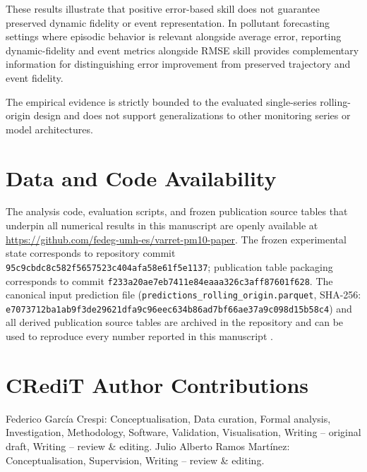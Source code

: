 \documentclass[12pt]{article}
\begin{document}
These results illustrate that positive error-based skill does not
guarantee preserved dynamic fidelity or event representation. In pollutant
forecasting settings where episodic behavior is relevant alongside average
error, reporting dynamic-fidelity and event metrics alongside RMSE skill
provides complementary information for distinguishing error improvement
from preserved trajectory and event fidelity.

The empirical evidence is strictly bounded to the evaluated single-series
rolling-origin design and does not support generalizations to other
monitoring series or model architectures.

\section*{Data and Code Availability}
\label{sec:data_availability}

The analysis code, evaluation scripts, and frozen publication source
tables that underpin all numerical results in this manuscript are
openly available at
\url{https://github.com/fedeg-umh-es/varret-pm10-paper}.
The frozen experimental state corresponds to repository commit
\texttt{95c9cbdc8c582f5657523c404afa58e61f5e1137}; publication
table packaging corresponds to commit
\texttt{f233a20ae7eb7411e84eaaa326c3aff87601f628}.
The canonical input prediction file
(\texttt{predictions\_rolling\_origin.parquet},
SHA-256: \texttt{e7073712ba1ab9f3de29621dfa9c96eec634b86ad7bf66ae37a9c098d15b58c4})
and all derived publication source tables are archived in the repository
and can be used to reproduce every number reported in this manuscript
\citep{sandve2013}.

\section*{CRediT Author Contributions}

Federico Garc\'ia Crespi: Conceptualisation, Data curation,
Formal analysis, Investigation, Methodology, Software, Validation,
Visualisation, Writing -- original draft, Writing -- review
\& editing.
Julio Alberto Ramos Mart\'inez: Conceptualisation, Supervision,
Writing -- review \& editing.

\end{document}
